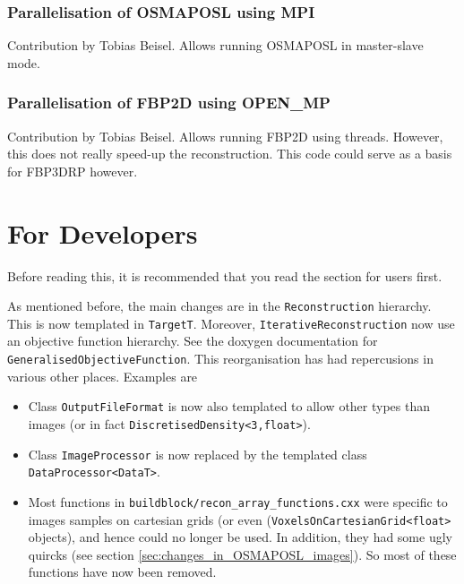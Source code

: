 \documentclass{article}
\begin{document}
\subsubsection{Parallelisation of OSMAPOSL using MPI}
Contribution by Tobias Beisel. Allows running OSMAPOSL in master-slave mode.
\subsubsection{Parallelisation of FBP2D using OPEN_MP}
Contribution by Tobias Beisel. Allows running FBP2D using threads.
However, this does not really speed-up the reconstruction. This code could
serve as a basis for FBP3DRP however.

\section{For Developers}

Before reading this, it is recommended that you read the section for
users first.

As mentioned before, the main changes are in the \texttt{Reconstruction}
hierarchy. This is now templated in \texttt{TargetT}. Moreover,
\texttt{IterativeReconstruction} now use an objective function hierarchy. See 
the doxygen documentation for \texttt{GeneralisedObjectiveFunction}. This
reorganisation has had repercusions in various other places. Examples are
\begin{itemize}
\item Class \texttt{OutputFileFormat} is now also templated to allow
other types than images (or in fact \texttt{DiscretisedDensity<3,float>}).
\item Class \texttt{ImageProcessor} is now replaced by the templated
class \texttt{DataProcessor<DataT>}.
\item Most functions in \texttt{buildblock/recon\_array\_functions.cxx}
were specific to images samples on cartesian grids 
(or even (\texttt{VoxelsOnCartesianGrid<float>} objects), and hence
could no longer be used. In addition, they had some ugly quircks
(see section \ref{sec:changes_in_OSMAPOSL_images}). So most of these
functions have now been removed.
\end{itemize}
\end{document}

